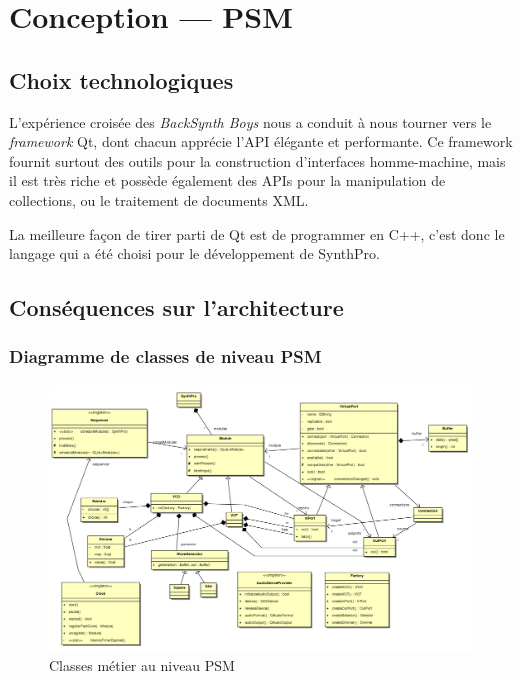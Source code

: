 \section{Conception — PSM}

\subsection{Choix technologiques}

L'expérience croisée des \emph{BackSynth Boys} nous a conduit à
nous tourner vers le \emph{framework} Qt, dont chacun apprécie
l'API élégante et performante. Ce framework fournit surtout des
outils pour la construction d'interfaces homme-machine, mais il est
très riche et possède également des APIs pour la manipulation de
collections, ou le traitement de documents XML.

La meilleure façon de tirer parti de Qt est de programmer en C++,
c'est donc le langage qui a été choisi pour le développement de
SynthPro.

\subsection{Conséquences sur l'architecture}

\subsubsection{Diagramme de classes de niveau PSM}

\begin{figure}[htb]
\centering
\includegraphics[width=21cm,angle=90]{../img/ps/business-psm.pdf}
\caption{Classes métier au niveau PSM}
\label{psm-class}
\end{figure}

